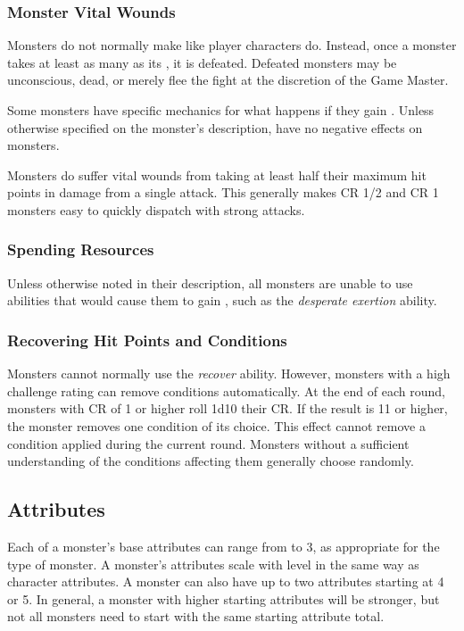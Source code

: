         \subsubsection{Monster Vital Wounds}
            Monsters do not normally make  like player characters do.
            Instead, once a monster takes at least as many  as its , it is defeated.
            Defeated monsters may be unconscious, dead, or merely flee the fight at the discretion of the Game Master.

            Some monsters have specific mechanics for what happens if they gain .
            Unless otherwise specified on the monster's description,  have no negative effects on monsters.

            Monsters do suffer vital wounds from taking at least half their maximum hit points in damage from a single attack.
            This generally makes CR 1/2 and CR 1 monsters easy to quickly dispatch with strong attacks.

        \subsubsection{Spending Resources}
            Unless otherwise noted in their description, all monsters are unable to use abilities that would cause them to gain , such as the \textit{desperate exertion} ability.

        \subsubsection{Recovering Hit Points and Conditions}
            Monsters cannot normally use the \textit{recover} ability.
            However, monsters with a high challenge rating can remove conditions automatically.
            At the end of each round, monsters with CR of 1 or higher roll 1d10 \add their CR.
            If the result is 11 or higher, the monster removes one condition of its choice.
            This effect cannot remove a condition applied during the current round.
            Monsters without a sufficient understanding of the conditions affecting them generally choose randomly.

    \subsection{Attributes}
        Each of a monster's base attributes can range from  to 3, as appropriate for the type of monster.
        A monster's attributes scale with level in the same way as character attributes.
        A monster can also have up to two attributes starting at 4 or 5.
        In general, a monster with higher starting attributes will be stronger, but not all monsters need to start with the same starting attribute total.

